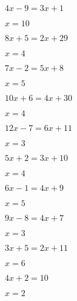 \documentclass{ximera}
\begin{document}
\begin{exercise}
\begin{xmmulticols}
  \begin{question} \( 4x - 9  =  3x + 1     \) \begin{oplossing} \( x  = 10 \) \end{oplossing} \end{question}
  \begin{question} \( 8x + 5  =  2x + 29    \) \begin{oplossing} \( x  = 4  \) \end{oplossing} \end{question}
  \begin{question} \( 7x - 2  =  5x + 8     \) \begin{oplossing} \( x  = 5  \) \end{oplossing} \end{question}
  \begin{question} \( 10x + 6 =  4x + 30    \) \begin{oplossing} \( x  = 4  \) \end{oplossing} \end{question}
  \begin{question} \( 12x - 7 =  6x + 11    \) \begin{oplossing} \( x  = 3  \) \end{oplossing} \end{question}
  \begin{question} \( 5x + 2  =  3x + 10    \) \begin{oplossing} \( x  = 4  \) \end{oplossing} \end{question}
  \begin{question} \( 6x - 1  =  4x + 9     \) \begin{oplossing} \( x  = 5  \) \end{oplossing} \end{question}
  \begin{question} \( 9x - 8  =  4x + 7     \) \begin{oplossing} \( x  = 3  \) \end{oplossing} \end{question}
  \begin{question} \( 3x + 5  =  2x + 11    \) \begin{oplossing} \( x  = 6  \) \end{oplossing} \end{question}
  \begin{question} \( 4x + 2  =  10         \) \begin{oplossing} \( x  = 2  \) \end{oplossing} \end{question}

\end{xmmulticols}
\end{exercise}
\end{document}
